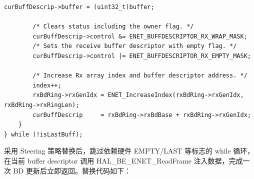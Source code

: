 \begin{lstlisting}[style=CStyle,abovecaptionskip=0pt,belowcaptionskip=0pt]
        curBuffDescrip->buffer = (uint32_t)buffer;

        /* Clears status including the owner flag. */
        curBuffDescrip->control &= ENET_BUFFDESCRIPTOR_RX_WRAP_MASK;
        /* Sets the receive buffer descriptor with empty flag. */
        curBuffDescrip->control |= ENET_BUFFDESCRIPTOR_RX_EMPTY_MASK;

        /* Increase Rx array index and buffer descriptor address. */
        index++;
        rxBdRing->rxGenIdx = ENET_IncreaseIndex(rxBdRing->rxGenIdx, rxBdRing->rxRingLen);
        curBuffDescrip     = rxBdRing->rxBdBase + rxBdRing->rxGenIdx;
    }
} while (!isLastBuff);
\end{lstlisting}

采用 Steering 策略替换后，跳过依赖硬件 EMPTY/LAST 等标志的 while 循环，在当前 buffer descriptor 调用 HAL\_BE\_ENET\_ReadFrame 注入数据，完成一次 BD 更新后立即返回。替换代码如下：

